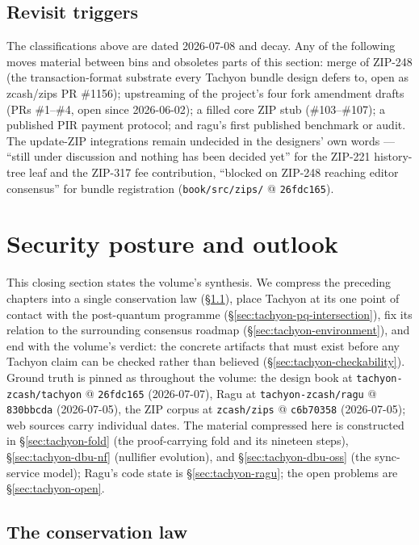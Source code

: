 \documentclass[11pt,a4paper]{article}
\theoremstyle{definition}
\begin{document}
\subsection{Revisit triggers}\label{sec:tachyon-revisit}

The classifications above are dated 2026-07-08 and decay. Any of the
following moves material between bins and obsoletes parts of this section:
merge of ZIP-248 (the transaction-format substrate every Tachyon bundle
design defers to, open as \textsf{zcash/zips} PR \#1156); upstreaming of
the project's four fork amendment drafts (PRs \#1--\#4, open since
2026-06-02); a filled core ZIP stub (\#103--\#107); a published PIR payment
protocol; and \textsf{ragu}'s first published benchmark or audit. The
update-ZIP integrations remain undecided in the designers' own words ---
``still under discussion and nothing has been decided yet'' for the ZIP-221
history-tree leaf and the ZIP-317 fee contribution, ``blocked on ZIP-248
reaching editor consensus'' for bundle registration
(\texttt{book/src/zips/} @ \texttt{26fdc165}).

\section{Security posture and outlook}\label{sec:tachyon-outlook}

This closing section states the volume's synthesis. We compress the
preceding chapters into a single conservation law
(\S\ref{sec:tachyon-conservation}), place Tachyon at its one point of
contact with the post-quantum programme
(\S\ref{sec:tachyon-pq-intersection}), fix its relation to the surrounding
consensus roadmap (\S\ref{sec:tachyon-environment}), and end with the
volume's verdict: the concrete artifacts that must exist before any Tachyon
claim can be checked rather than believed
(\S\ref{sec:tachyon-checkability}). Ground truth is pinned as throughout the
volume: the design book at \texttt{tachyon-zcash/tachyon} @
\texttt{26fdc165} (2026-07-07), Ragu at \texttt{tachyon-zcash/ragu} @
\texttt{830bbcda} (2026-07-05), the ZIP corpus at \texttt{zcash/zips} @
\texttt{c6b70358} (2026-07-05); web sources carry individual dates. The
material compressed here is constructed in \S\ref{sec:tachyon-fold} (the
proof-carrying fold and its nineteen steps), \S\ref{sec:tachyon-dbu-nf}
(nullifier evolution), and \S\ref{sec:tachyon-dbu-oss} (the sync-service
model); Ragu's code state is \S\ref{sec:tachyon-ragu}; the open problems are
\S\ref{sec:tachyon-open}.

\subsection{The conservation law}\label{sec:tachyon-conservation}
\end{document}

